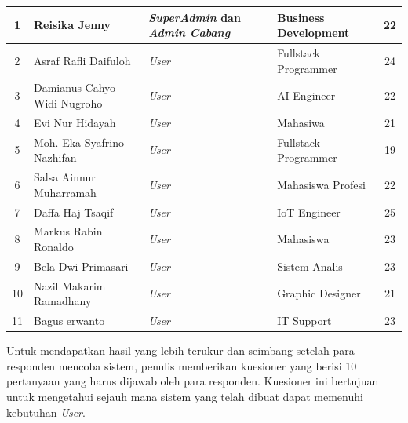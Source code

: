 \begin{longtable}{|c|p{3.5cm}|p{3.5cm}|p{3.5cm}|c|}
    1           & Reisika Jenny               & \textit{SuperAdmin} dan \newline \textit{Admin Cabang} & Business Development & 22            \\ \hline
    2           & Asraf Rafli Daifuloh        & \textit{User}                                          & Fullstack Programmer & 24            \\ \hline
    3           & Damianus Cahyo Widi Nugroho & \textit{User}                                          & AI Engineer          & 22            \\ \hline
    4           & Evi Nur Hidayah             & \textit{User}                                          & Mahasiwa             & 21            \\ \hline
    5           & Moh. Eka Syafrino Nazhifan  & \textit{User}                                          & Fullstack Programmer & 19            \\ \hline
    6           & Salsa Ainnur Muharramah     & \textit{User}                                          & Mahasiswa Profesi    & 22            \\ \hline
    7           & Daffa Haj Tsaqif            & \textit{User}                                          & IoT Engineer         & 25            \\ \hline
    8           & Markus Rabin Ronaldo        & \textit{User}                                          & Mahasiswa            & 23            \\ \hline
    9           & Bela Dwi Primasari          & \textit{User}                                          & Sistem Analis        & 23            \\ \hline
    10          & Nazil Makarim Ramadhany     & \textit{User}                                          & Graphic Designer     & 21            \\ \hline
    11          & Bagus erwanto               & \textit{User}                                          & IT Support           & 23            \\ \hline
\end{longtable}

Untuk mendapatkan hasil yang lebih terukur dan seimbang setelah para responden mencoba sistem, penulis memberikan kuesioner yang berisi 10 pertanyaan yang harus dijawab oleh para responden. Kuesioner ini bertujuan untuk mengetahui sejauh mana sistem yang telah dibuat dapat memenuhi kebutuhan \textit{User}.

